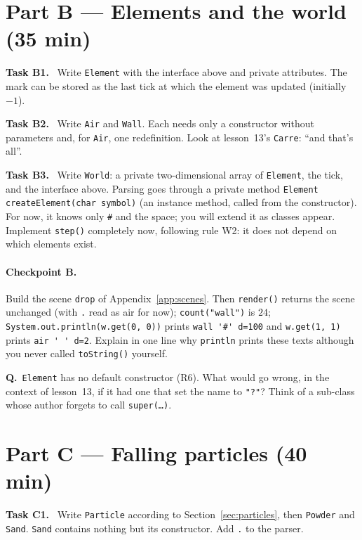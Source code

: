 \documentclass[11pt,a4paper]{article}
\newcommand{\code}[1]{\texttt{#1}}
\newcounter{qcount}
\newcommand{\Q}{\refstepcounter{qcount}\textbf{Q\theqcount.}\ }
\newcommand{\task}[1]{\par\medskip\textbf{Task #1.}\ }
\begin{document}
\section{Part B --- Elements and the world (35 min)}

\task{B1} Write \code{Element} with the interface above and private attributes. The mark can be
stored as the last tick at which the element was updated (initially \(-1\)).

\task{B2} Write \code{Air} and \code{Wall}. Each needs only a constructor without parameters and,
for \code{Air}, one redefinition. Look at lesson~13's \code{Carre}: ``and that's all''.

\task{B3} Write \code{World}: a private two-dimensional array of \code{Element}, the tick, and
the interface above. Parsing goes through a private method \code{Element createElement(char symbol)}
(an instance method, called from the constructor). For now, it knows only \verb|#| and the space;
you will extend it as classes appear. Implement \code{step()} completely now, following rule W2:
it does not depend on which elements exist.

\paragraph{Checkpoint B.} Build the scene \code{drop} of Appendix~\ref{app:scenes}. Then
\code{render()} returns the scene unchanged (with \verb|.| read as air for now);
\code{count("wall")} is \(24\); \code{System.out.println(w.get(0, 0))} prints \verb|wall '#' d=100|
and \code{w.get(1, 1)} prints \verb*|air ' ' d=2|. Explain in one line why \code{println} prints
these texts although you never called \code{toString()} yourself.

\Q \code{Element} has no default constructor (R6). What would go wrong, in the context of
lesson~13, if it had one that set the name to \code{"?"}? Think of a sub-class whose author
forgets to call \code{super(\ldots)}.

\section{Part C --- Falling particles (40 min)}

\task{C1} Write \code{Particle} according to Section~\ref{sec:particles}, then \code{Powder} and
\code{Sand}. \code{Sand} contains nothing but its constructor. Add \verb|.| to the parser.
\end{document}
